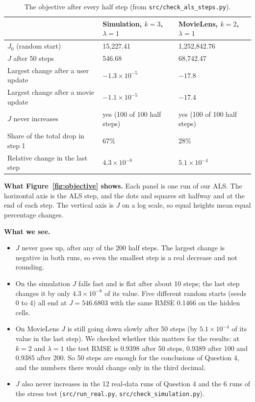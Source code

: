 \begin{table}[h]
\centering
\begin{tabular}{lll}
\hline
 & Simulation, $k = 3$, $\lambda = 1$ & MovieLens, $k = 2$, $\lambda = 1$ \\
\hline
$J_0$ (random start) & 15{,}227.41 & 1{,}252{,}842.76 \\
$J$ after 50 steps & 546.68 & 68{,}742.47 \\
Largest change after a user update & $-1.3\times10^{-5}$ & $-17.8$ \\
Largest change after a movie update & $-1.1\times10^{-5}$ & $-17.4$ \\
$J$ never increases & yes (100 of 100 half steps) & yes (100 of 100 half steps) \\
Share of the total drop in step 1 & 67\% & 28\% \\
Relative change in the last step & $4.3\times10^{-8}$ & $5.1\times10^{-4}$ \\
\hline
\end{tabular}
\caption{The objective after every half step (from \texttt{src/check\_als\_steps.py}).}
\label{tab:q5}
\end{table}

\textbf{What Figure~\ref{fig:objective} shows.} Each panel is one run of our ALS. The horizontal axis is the ALS step, and the dots and squares sit halfway and at the end of each step. The vertical axis is $J$ on a log scale, so equal heights mean equal percentage changes.

\textbf{What we see.}
\begin{itemize}
  \item $J$ never goes up, after any of the 200 half steps. The largest change is negative in both runs, so even the smallest step is a real decrease and not rounding.
  \item On the simulation $J$ falls fast and is flat after about 10 steps; the last step changes it by only $4.3\times10^{-8}$ of its value. Five different random starts (seeds 0 to 4) all end at $J = 546.6803$ with the same RMSE 0.1466 on the hidden cells.
  \item On MovieLens $J$ is still going down slowly after 50 steps (by $5.1\times10^{-4}$ of its value in the last step). We checked whether this matters for the results: at $k = 2$ and $\lambda = 1$ the test RMSE is 0.9398 after 50 steps, 0.9389 after 100 and 0.9385 after 200. So 50 steps are enough for the conclusions of Question 4, and the numbers there would change only in the third decimal.
  \item $J$ also never increases in the 12 real-data runs of Question 4 and the 6 runs of the stress test (\texttt{src/run\_real.py}, \texttt{src/check\_simulation.py}).
\end{itemize}

